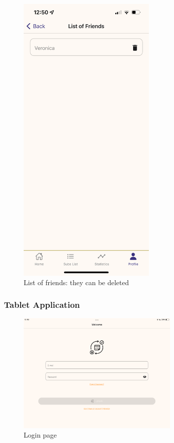\documentclass[12pt]{article}
\begin{document}
\begin{figure}[h!]
\begin{minipage}[c]{0.45\textwidth}
        \includegraphics[width=0.6\textwidth, clip]{../../assets/smartphone/listFriends.PNG}
        \caption{List of friends: they can be deleted}
        \label{fig:listFriends}
    \end{minipage}
\end{figure}

\clearpage
\subsubsection{Tablet Application}

\begin{figure}[h!]
    \begin{center}
        \includegraphics[width=0.7\textwidth, clip]{../../assets/tablet/login.png}
    \end{center}
    \caption{Login page}
    \label{fig:tlogin}
\end{figure}
\end{document}
